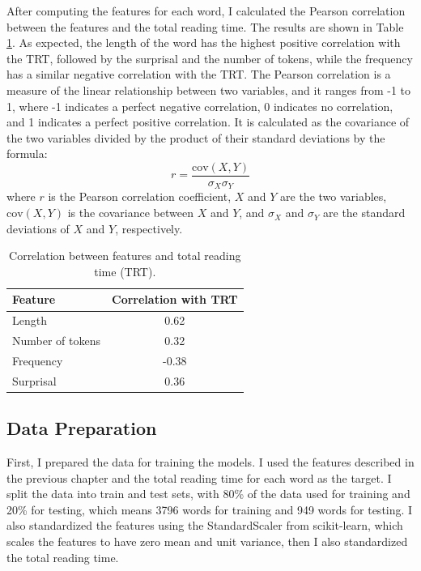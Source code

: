 After computing the features for each word, I calculated the Pearson correlation between the features and the total reading time. The results are shown in Table \ref{tab:feature_correlation}. As expected, the length of the word has the highest positive correlation with the TRT, followed by the surprisal and the number of tokens, while the frequency has a similar negative correlation with the TRT. The Pearson correlation is a measure of the linear relationship between two variables, and it ranges from -1 to 1, where -1 indicates a perfect negative correlation, 0 indicates no correlation, and 1 indicates a perfect positive correlation. It is calculated as the covariance of the two variables divided by the product of their standard deviations by the formula:
\begin{equation}
    r = \frac{\text{cov}(X, Y)}{\sigma_X \sigma_Y}
\end{equation}
where \( r \) is the Pearson correlation coefficient, \( X \) and \( Y \) are the two variables, \( \text{cov}(X, Y) \) is the covariance between \( X \) and \( Y \), and \( \sigma_X \) and \( \sigma_Y \) are the standard deviations of \( X \) and \( Y \), respectively.

\begin{table}
    \centering
    \begin{tabular}{|l|c|}
        \hline
        Feature & Correlation with TRT \\
        \hline
        Length & 0.62 \\
        Number of tokens & 0.32 \\
        Frequency & -0.38 \\
        Surprisal & 0.36 \\
        \hline
    \end{tabular}
    \caption{Correlation between features and total reading time (TRT).}
    \label{tab:feature_correlation}
\end{table}

\subsection{Data Preparation}
First, I prepared the data for training the models. I used the features described in the previous chapter and the total reading time for each word as the target. I split the data into train and test sets, with 80\% of the data used for training and 20\% for testing, which means 3796 words for training and 949 words for testing. I also standardized the features using the StandardScaler from scikit-learn, which scales the features to have zero mean and unit variance, then I also standardized the total reading time.

